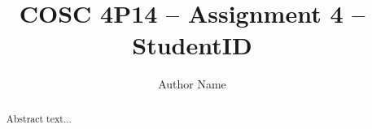 \documentclass[format=acmsmall, review=false, screen=true]{acmart}
\begin{document}
 
\title[Title]{COSC 4P14 -- Assignment 4 -- StudentID}  

\author{Author Name}

\begin{abstract}

Abstract text...

\end{abstract}




\end{document}

